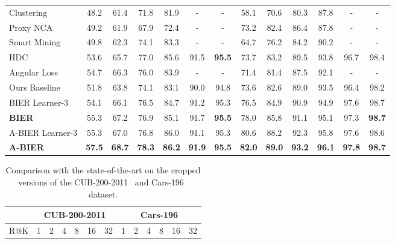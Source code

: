 \documentclass[10pt,journal,compsoc]{IEEEtran}
\begin{document}
\begin{table*}[!htbp]
\begin{tabular}{l|cccccc|cccccc}
        Clustering~\cite{song2017cvpr}                 & 48.2  & 61.4  & 71.8 & 81.9   & -    & -                                      & 58.1 & 70.6 & 80.3 & 87.8 & -    & -   \\
        Proxy NCA~\cite{movshovitz-attias2017iccv}     & 49.2  & 61.9  & 67.9 & 72.4   & -    & -                                      & 73.2 & 82.4 & 86.4 & 87.8 & -    & -   \\
        Smart Mining~\cite{harwood2017iccv}            & 49.8  & 62.3 & 74.1  & 83.3  & -    & -                                       & 64.7 & 76.2 & 84.2 & 90.2 & -    & -   \\
        HDC~\cite{yuan2016hard}                        & 53.6  & 65.7  & 77.0 & 85.6 & 91.5 & \textbf{95.5}          & 73.7  & 83.2  & 89.5 & 93.8 & 96.7 & 98.4 \\
        Angular Loss~\cite{wang2017iccv}               & 54.7  & 66.3  & 76.0 & 83.9 & -    & -                                        & 71.4 & 81.4 & 87.5 & 92.1 & -    & -   \\
        \hline
        Ours Baseline                                  & 51.8 & 63.8 & 74.1 & 83.1 & 90.0 & 94.8                                       & 73.6 & 82.6 & 89.0 & 93.5 & 96.4 & 98.2 \\
        BIER Learner-3~\cite{opitz2017bier}            & 54.1 & 66.1 & 76.5 & 84.7 & 91.2 & 95.3                                       & 76.5 & 84.9 & 90.9 & 94.9 & 97.6 & 98.7 \\
        \textbf{BIER}~\cite{opitz2017bier}             & 55.3 & 67.2 & 76.9 & 85.1 & 91.7 & \textbf{95.5}                              & 78.0 & 85.8 & 91.1 & 95.1 & 97.3 & \textbf{98.7} \\
        \hline
        A-BIER Learner-3                     & 55.3 & 67.0 & 76.8 & 86.0 & 91.1 & 95.3                                       & 80.6 & 88.2 & 92.3 & 95.8 & 97.6 & 98.6 \\
        \textbf{A-BIER}                      & \textbf{57.5} & \textbf{68.7} & \textbf{78.3} & \textbf{86.2} & \textbf{91.9} & \textbf{95.5} & \textbf{82.0} & \textbf{89.0} & \textbf{93.2} & \textbf{96.1} & \textbf{97.8} & \textbf{98.7} \\
        \hline
    \end{tabular}
\end{table*}\begin{table*}[!htbp]
    \caption{Comparison with the state-of-the-art on the cropped versions of the CUB-200-2011~\cite{WahCUB_200_2011} and Cars-196~\cite{krause20133d} dataset.}
    \label{tbl:sota-cub-200-2011-cars-196-cropped}
    \renewcommand{\arraystretch}{1.3}
    \centering
    \begin{tabular}{l|cccccc|cccccc}
        \hline
        & \multicolumn{6}{c}{CUB-200-2011} & \multicolumn{6}{c}{Cars-196} \\
        \hline
        R@K                                            & 1     & 2     & 4    & 8    & 16   & 32                                       & 1 & 2 & 4 & 8 & 16 & 32  \\
        \hline


\end{tabular}
\end{table*}
\end{document}
